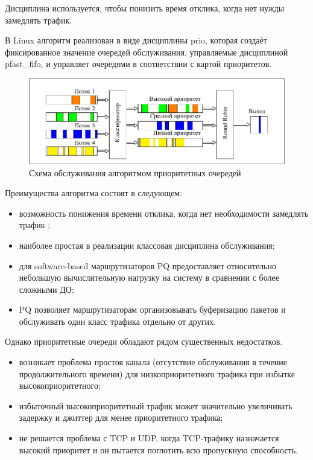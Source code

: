     Дисциплина используется, чтобы понизить время отклика, когда нет нужды замедлять трафик\cite{tcprio}. 

    В Linux алгоритм реализован в виде дисциплины prio, которая создаёт фиксированное
    значение очередей обслуживания, управляемые дисциплиной pfast\_fifo, и управляет
    очередями в соответствии с картой приоритетов.\cite{tcprio}

    \begin{figure}[ht!]
        \center
        \includegraphics[scale=1.3]{pdfimages/pq.pdf}
        \caption{Схема обслуживания алгоритмом приоритетных очередей}
    \end{figure}

    Преимущества алгоритма состоят в следующем:
    \begin{itemize}
		\item возможность понижения времени отклика, когда нет необходимости замедлять трафик \cite{tcprio};
        \item наиболее простая в реализации классовая дисциплина обслуживания;
        \item для software-based маршрутизаторов PQ предоставляет относительно небольшую
             вычислительную нагрузку на систему в сравнении с более сложными ДО;
        \item PQ позволяет маршрутизаторам организовывать буферизацию пакетов и обслуживать
             один класс трафика отдельно от других. \cite{suppdiff}
    \end{itemize}

    Однако приоритетные очереди обладают рядом существенных недостатков.
    \begin{itemize}
        \item возникает проблема простоя канала (отсутствие обслуживания в течение продолжительного времени)
			  для низкоприоритетного трафика при избытке высокоприоритетного\cite{packethandling};
        \item избыточный высокоприоритетный трафик может значительно увеличивать
                задержку и джиттер для менее приоритетного трафика;
        \item не решается проблема с TCP и UDP, когда TCP-трафику назначается высокий приоритет и он
                пытается поглотить всю пропускную способность. \cite{suppdiff}
    \end{itemize}


